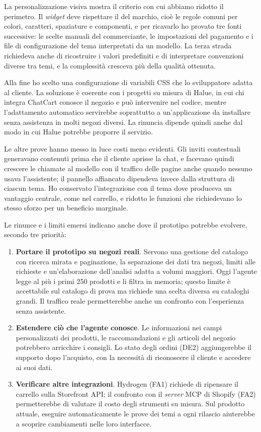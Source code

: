 La personalizzazione visiva mostra il criterio con cui abbiamo ridotto il perimetro. Il
\emph{widget} deve rispettare il  del marchio, cioè le
regole comuni per colori, caratteri, spaziature e componenti, e per ricavarlo ho provato tre fonti
successive: le scelte manuali del commerciante, le impostazioni del pagamento e i file di
configurazione del tema interpretati da un modello. La terza strada richiedeva anche di ricostruire
i valori predefiniti e di interpretare convenzioni diverse tra temi, e la complessità cresceva più
della qualità ottenuta.

Alla fine ho scelto una configurazione di variabili CSS che lo sviluppatore adatta al cliente. La
soluzione è coerente con i progetti su misura di Halue, in cui chi integra ChatCart conosce il
negozio e può intervenire nel codice, mentre l’adattamento automatico servirebbe soprattutto a
un’applicazione da installare senza assistenza in molti negozi diversi. La rinuncia dipende quindi
anche dal modo in cui Halue potrebbe proporre il servizio.

Le altre prove hanno messo in luce costi meno evidenti. Gli inviti contestuali generavano
contenuti prima che il cliente aprisse la chat, e facevano quindi crescere le chiamate al modello
con il traffico delle pagine anche quando nessuno usava l’assistente; il pannello affiancato
dipendeva invece dalla struttura di ciascun tema. Ho conservato l’integrazione con il tema dove
produceva un vantaggio centrale, come nel carrello, e ridotto le funzioni che richiedevano lo
stesso sforzo per un beneficio marginale.

Le rinunce e i limiti emersi indicano anche dove il prototipo potrebbe evolvere, secondo tre
priorità:

\begin{enumerate}
	\item \textbf{Portare il prototipo su negozi reali}. Servono una gestione del catalogo con
	ricerca mirata e paginazione, la separazione dei dati tra negozi, limiti alle richieste e
	un’elaborazione dell’analisi adatta a volumi maggiori. Oggi l’agente legge al più i primi 250
	prodotti e li filtra in memoria; questo limite è accettabile sul catalogo di prova ma
	richiede una scelta diversa su cataloghi grandi. Il traffico reale permetterebbe anche un
	confronto con l’esperienza senza assistente.
	\item \textbf{Estendere ciò che l’agente conosce}. Le informazioni nei campi personalizzati
	dei prodotti, le raccomandazioni e gli articoli del negozio potrebbero arricchire i consigli.
	Lo stato degli ordini (DE2) aggiungerebbe il supporto dopo l’acquisto, con la necessità di
	riconoscere il cliente e accedere ai suoi dati.
	\item \textbf{Verificare altre integrazioni}. Hydrogen (FA1) richiede di ripensare il carrello
	sulla Storefront API; il confronto con il \emph{server} MCP di Shopify (FA2) permetterebbe di
	valutare il costo degli strumenti su misura. Sul prodotto attuale, eseguire automaticamente le
	prove dei temi a ogni rilascio aiuterebbe a scoprire cambiamenti nelle loro interfacce.
\end{enumerate}

